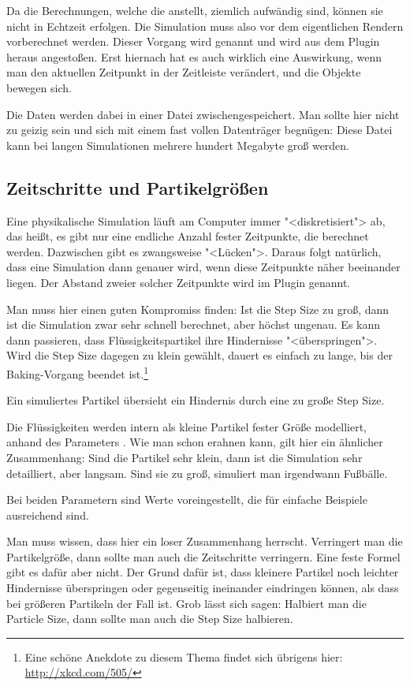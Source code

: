 \documentclass[10pt,DIV=14,a4paper]{scrartcl}
\begin{document}
Da die Berechnungen, welche die \fluidsim anstellt, ziemlich aufwändig
sind, können sie nicht in Echtzeit erfolgen. Die Simulation muss also
vor dem eigentlichen Rendern vorberechnet werden. Dieser Vorgang wird
 genannt und wird aus dem Plugin heraus angestoßen. Erst
hiernach hat es auch wirklich eine Auswirkung, wenn man den aktuellen
Zeitpunkt in der Zeitleiste verändert, und die Objekte bewegen sich.

Die Daten werden dabei in einer Datei zwischengespeichert. Man sollte
hier nicht zu geizig sein und sich mit einem fast vollen Datenträger
begnügen: Diese Datei kann bei langen Simulationen mehrere hundert
Megabyte groß werden.

\subsection{Zeitschritte und Partikelgrößen}
Eine physikalische Simulation läuft am Computer immer "<diskretisiert">
ab, das heißt, es gibt nur eine endliche Anzahl fester Zeitpunkte, die
berechnet werden. Dazwischen gibt es zwangsweise "<Lücken">. Daraus
folgt natürlich, dass eine Simulation dann genauer wird, wenn diese
Zeitpunkte näher beeinander liegen. Der Abstand zweier solcher
Zeitpunkte wird im Plugin  genannt.

Man muss hier einen guten Kompromiss finden: Ist die Step Size zu groß,
dann ist die Simulation zwar sehr schnell berechnet, aber höchst
ungenau. Es kann dann passieren, dass Flüssigkeitspartikel ihre
Hindernisse "<überspringen">. Wird die Step Size dagegen zu klein
gewählt, dauert es einfach zu lange, bis der Baking-Vorgang beendet
ist.\footnote{Eine schöne Anekdote zu diesem Thema findet sich übrigens
hier: \url{http://xkcd.com/505/}}

{Ein simuliertes Partikel übersieht ein Hindernis durch eine zu große
Step Size.}

Die Flüssigkeiten werden intern als kleine Partikel fester Größe
modelliert, anhand des Parameters . Wie man schon
erahnen kann, gilt hier ein ähnlicher Zusammenhang: Sind die Partikel
sehr klein, dann ist die Simulation sehr detailliert, aber langsam. Sind
sie zu groß, simuliert man irgendwann Fußbälle.

Bei beiden Parametern sind Werte voreingestellt, die für einfache
Beispiele ausreichend sind.

Man muss wissen, dass hier ein loser Zusammenhang herrscht. Verringert
man die Partikelgröße, dann sollte man auch die Zeitschritte verringern.
Eine feste Formel gibt es dafür aber nicht. Der Grund dafür ist, dass
kleinere Partikel noch leichter Hindernisse überspringen oder
gegenseitig ineinander eindringen können, als dass bei größeren
Partikeln der Fall ist. Grob lässt sich sagen: Halbiert man die Particle
Size, dann sollte man auch die Step Size halbieren.
\end{document}
